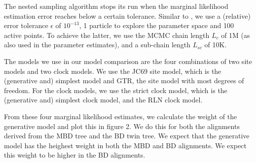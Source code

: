 The nested sampling algorithm stops its run 
when the marginal likelihood estimation error 
reaches below a certain tolerance.  
Similar to \cite{maturana2018},
we use a (relative) error tolerance $\epsilon$ of $10^{-13}$,
1 particle to explore the parameter space
and 100 active points. 
To achieve the latter, we use the MCMC chain length $L_c$ of 1M 
(as also used in the parameter estimates),
and a sub-chain length $L_{sc}$ of 10K.

The models we use in our model comparison are the four combinations
of two site models and two clock models. We use the JC69 site model, which
is the (generative and) simplest model and GTR, the site model with most
degrees of freedom. For the clock models, we use the strict clock model,
which is the (generative and) simplest clock model, and the RLN clock model.

From these four marginal likelihood estimates, we calculate the weight of
the generative model and plot this in figure 2. We do this for both the 
alignments derived from the MBD tree and the BD twin tree. We expect that
the generative model has the heighest weight in both the MBD and BD alignments.
We expect this weight to be higher in the BD alignments.
\fi